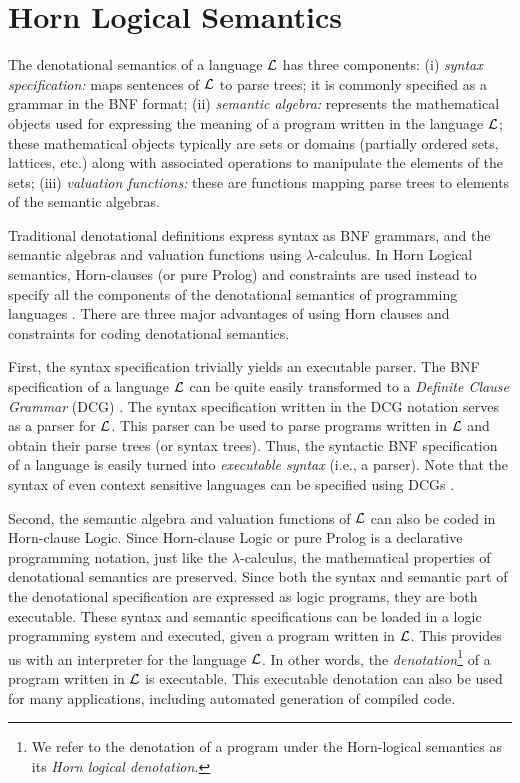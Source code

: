 \documentclass{entcs}
\begin{document}
\section{Horn Logical Semantics}

The denotational semantics of
a language $\cal L$ has three components:
(i) {\it syntax specification:} maps sentences of $\cal L$ to
parse trees; it is commonly specified as a grammar in the BNF format;
(ii) {\it semantic algebra:} represents the mathematical objects used
for expressing the meaning of a program written in the language $\cal L$\/;
these mathematical objects typically are sets or domains (partially
ordered sets, lattices, etc.)
along with associated operations to manipulate the elements of the
sets;
(iii)
{\it valuation functions:} these are functions mapping
parse trees  to elements of the semantic algebras.

Traditional denotational definitions express syntax as BNF grammars,
and the semantic algebras and valuation functions using $\lambda$-calculus. 
In Horn Logical semantics, Horn-clauses (or pure Prolog) and constraints
are used instead to specify all the components of the denotational
semantics of programming languages \cite{logden}. 
There are three major advantages of using Horn clauses and constraints 
for coding denotational semantics.

First, the syntax specification trivially yields an executable parser. 
The BNF specification of a language ${\cal L}$ can be quite easily transformed to a
{\it Definite Clause Grammar} (DCG) \cite{prolog}. 
The syntax specification written in the DCG notation serves as 
a parser for ${\cal L}$. This
parser can be used to parse programs written in ${\cal L}$ and obtain
their parse trees (or syntax trees). 
Thus, the syntactic BNF specification of a language is easily
turned into {\it executable syntax} (i.e., a parser). Note that
the syntax of even context sensitive languages can be specified
using DCGs \cite{killer}.

Second, the semantic algebra and valuation functions of ${\cal L}$ can also be coded
in Horn-clause Logic. Since Horn-clause Logic or pure Prolog is a declarative
programming notation, just like the $\lambda$-calculus, the 
mathematical properties of denotational semantics are preserved.
Since both the syntax and semantic part of the denotational
specification are expressed as logic programs, they are both
executable. These syntax and semantic  specifications  can
be loaded in a logic programming system and executed, given a program
written in $\cal L$. This provides us with an
interpreter for the language $\cal L$\/. 
In other words, the  {\it denotation}\footnote{We refer to 
the denotation of a program under the Horn-logical semantics as its {\it Horn logical
denotation.}} of a program
written in $\cal L$ is executable. This executable denotation can
also be used for many applications, including automated generation
of compiled code.
\end{document}
